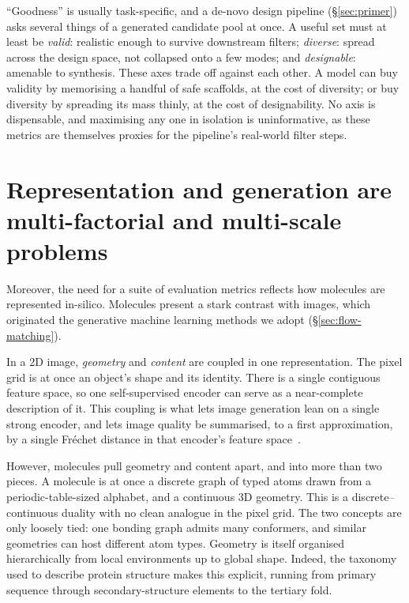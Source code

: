 \documentclass[12pt,a4paper,twoside]{report}
\begin{document}
``Goodness'' is usually task-specific, and a de-novo design pipeline (\S\ref{sec:primer}) asks several things of a generated candidate pool at once. A useful set must at least be \emph{valid}: realistic enough to survive downstream filters; \emph{diverse}: spread across the design space, not collapsed onto a few modes; and \emph{designable}: amenable to synthesis. These axes trade off against each other. A model can buy validity by memorising a handful of safe scaffolds, at the cost of diversity; or buy diversity by spreading its mass thinly, at the cost of designability. No axis is dispensable, and maximising any one in isolation is uninformative, as these metrics are themselves proxies for the pipeline's real-world filter steps.

\section{Representation and generation are multi-factorial and multi-scale problems}
\label{sec:eval-multifactorial}


Moreover, the need for a suite of evaluation metrics reflects how molecules are represented in-silico. Molecules present a stark contrast with images, which originated the generative machine learning methods we adopt (\S\ref{sec:flow-matching}).

In a 2D image, \emph{geometry} and \emph{content} are coupled in one representation. The pixel grid is at once an object's shape and its identity. There is a single contiguous feature space, so one self-supervised encoder can serve as a near-complete description of it. This coupling is what lets image generation lean on a single strong encoder, and lets image quality be summarised, to a first approximation, by a single Fr\'echet distance in that encoder's feature space~\cite{FID}.

However, molecules pull geometry and content apart, and into more than two pieces. A molecule is at once a discrete graph of typed atoms drawn from a periodic-table-sized alphabet, and a continuous 3D geometry. This is a discrete--continuous duality with no clean analogue in the pixel grid. The two concepts are only loosely tied: one bonding graph admits many conformers, and similar geometries can host different atom types. Geometry is itself organised hierarchically from local environments up to global shape. Indeed, the taxonomy used to describe protein structure makes this explicit, running from primary sequence through secondary-structure elements to the tertiary fold.
\end{document}

